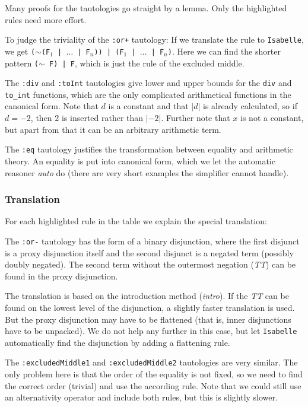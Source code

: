 \documentclass[10pt,a4paper]{article}
\newcommand{\isa}{\texttt{Isabelle}\xspace}
\newcommand{\ttt}{\texttt}
\newcommand{\negat}{\ensuremath{\sim}}
\newcommand{\nega}{\negat\xspace}
\newcommand{\TTx}{\emph{TT}}
\newcommand{\TT}{\TTx\xspace}
\newcommand{\tointx}{\texttt{to\_int}}
\newcommand{\toint}{\tointx\xspace}
\newcommand{\hl}[1]{{\color{red}#1}}
\begin{document}
Many proofs for the tautologies go straight by a lemma. Only the \hl{highlighted} rules need more effort.

To judge the triviality of the \ttt{:or+} tautology: If we translate the rule to \isa, we get \mbox{\ttt{(\nega (F$_1$ | $\dots$ | F$_n$)) | (F$_1$ | $\dots$ | F$_n$)}}. Here we can find the shorter pattern \mbox{\ttt{(\nega F) | F}}, which is just the rule of the excluded middle.

The \ttt{:div} and \ttt{:toInt} tautologies give lower and upper bounds for the \ttt{div} and \toint functions, which are the only complicated arithmetical functions in the canonical form. Note that $d$ is a constant and that $|d|$ is already calculated, so if $d = -2$, then $2$ is inserted rather than $|-2|$. Further note that $x$ is not a constant, but apart from that it can be an arbitrary arithmetic term.

The \ttt{:eq} tautology justifies the transformation between equality and arithmetic theory. An equality is put into canonical form, which we let the automatic reasoner \emph{auto} do (there are very short examples the simplifier cannot handle).
%
\subsubsection*{Translation}
For each \hl{highlighted} rule in the table we explain the special translation:

\smallskip

The \ttt{:or-} tautology has the form of a binary disjunction, where the first disjunct is a proxy disjunction itself and the second disjunct is a negated term (possibly doubly negated). The second term without the outermost negation (\TT) can be found in the proxy disjunction.

The translation is based on the introduction method (\emph{intro}). If the \TT can be found on the lowest level of the disjunction, a slightly faster translation is used. But the proxy disjunction may have to be flattened (that is, inner disjunctions have to be unpacked). We do not help any further in this case, but let \isa automatically find the disjunction by adding a flattening rule.

\smallskip

The \ttt{:excludedMiddle1} and \ttt{:excludedMiddle2} tautologies are very similar. The only problem here is that the order of the equality is not fixed, so we need to find the correct order (trivial) and use the according rule. Note that we could still use an alternativity operator and include both rules, but this is slightly slower.
\end{document}
